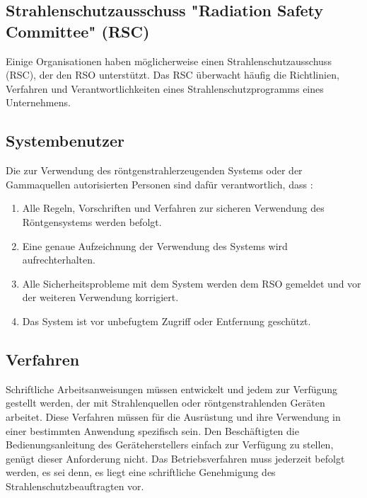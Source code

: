 {\subsection{Strahlenschutzausschuss "Radiation Safety Committee" (RSC)}
Einige Organisationen haben möglicherweise einen Strahlenschutzausschuss (RSC), der den RSO unterstützt. Das RSC überwacht häufig die Richtlinien, Verfahren und Verantwortlichkeiten eines Strahlenschutzprogramms eines Unternehmens.
\subsection{Systembenutzer}
Die zur Verwendung des röntgenstrahlerzeugenden Systems oder der Gammaquellen autorisierten Personen sind dafür verantwortlich, dass :
\begin{enumerate}
\item Alle Regeln, Vorschriften und Verfahren zur sicheren Verwendung des Röntgensystems werden befolgt.
\item Eine genaue Aufzeichnung der Verwendung des Systems wird aufrechterhalten.
\item Alle Sicherheitsprobleme mit dem System werden dem RSO gemeldet und vor der weiteren Verwendung korrigiert.
\item Das System ist vor unbefugtem Zugriff oder Entfernung geschützt.
\end{enumerate}
\subsection{Verfahren}
Schriftliche Arbeitsanweisungen müssen entwickelt und jedem zur Verfügung gestellt werden, der mit Strahlenquellen oder röntgenstrahlenden Geräten arbeitet. Diese Verfahren müssen für die Ausrüstung und ihre Verwendung in einer bestimmten Anwendung spezifisch sein. Den Beschäftigten die Bedienungsanleitung des Geräteherstellers einfach zur Verfügung zu stellen, genügt dieser Anforderung nicht. Das Betriebsverfahren muss jederzeit befolgt werden, es sei denn, es liegt eine schriftliche Genehmigung des Strahlenschutzbeauftragten vor.
}
